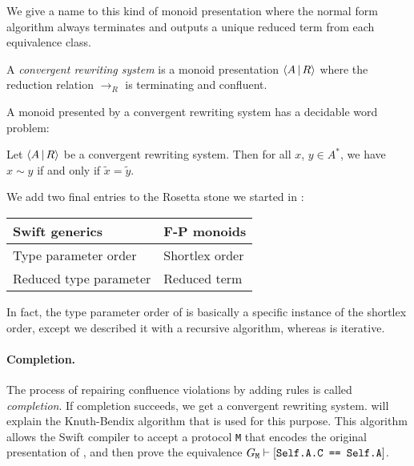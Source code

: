 \documentclass[../generics]{subfiles}
\begin{document}
We give a name to this kind of monoid presentation where the normal form algorithm always terminates and outputs a unique reduced term from each equivalence class.

\begin{definition}
A \emph{convergent rewriting system} is a monoid presentation $\langle A\,|\,R\rangle$ where the reduction relation $\rightarrow_R$ is terminating and confluent.
\end{definition}

A monoid presented by a convergent rewriting system has a decidable word problem:

\begin{corollary}\label{convergent decidable}
Let $\langle A\,|\,R\rangle$ be a convergent rewriting system. Then for all $x$, $y\in A^*$, we have $x\sim y$ if and only if $\tilde{x}=\tilde{y}$.
\end{corollary}

We add two final entries to the Rosetta stone we started in :
\begin{center}
\begin{tabular}{ll}
\toprule
\textbf{Swift generics}&\textbf{F-P monoids}\\
\midrule
Type parameter order&Shortlex order\\
Reduced type parameter&Reduced term\\
\bottomrule
\end{tabular}
\end{center}
In fact, the type parameter order of  is basically a specific instance of the shortlex order, except we described it with a recursive algorithm, whereas  is iterative.

\paragraph{Completion.} The process of repairing confluence violations by adding rules is called \emph{completion}. If completion succeeds, we get a convergent rewriting system.  will explain the Knuth-Bendix algorithm that is used for this purpose. This algorithm allows the Swift compiler to accept a protocol \texttt{M} that encodes the original presentation of , and then prove the equivalence $G_\texttt{M}\vdash[\texttt{Self.A.C == Self.A}]$.
\end{document}
